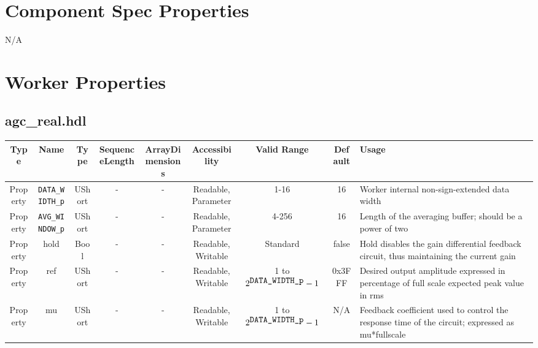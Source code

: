 \documentclass{article}
\def\comp{agc\_real}
\begin{document}
\begin{landscape}
\section*{Component Spec Properties}
	N/A

\section*{Worker Properties}
\subsection*{\comp.hdl}
\begin{scriptsize}
	\begin{tabular}{|c|c|c|c|c|c|c|c|p{6.9cm}|}
		\hline
		\rowcolor{blue}
		Type     & Name                & Type   & SequenceLength & ArrayDimensions & Accessibility       & Valid Range & Default & Usage                                        \\
		\hline
		Property & \verb+DATA_WIDTH_p+ & UShort & -              & -               & Readable, Parameter & 1-16        & 16      & Worker internal non-sign-extended data width \\
		\hline
		Property & \verb+AVG_WINDOW_p+ & UShort & -              & -               & Readable, Parameter & 4-256       & 16      & Length of the averaging buffer; should be a power of two \\
		\hline
		Property & hold                & Bool   & -              & -               & Readable, Writable  & Standard    & false   & Hold disables the gain differential feedback circuit, thus maintaining the current gain \\
		\hline
		Property & ref                 & UShort & -              & -               & Readable, Writable  & 1 to $2^{\verb+DATA_WIDTH_p+}-1$ & 0x3FFF & Desired output amplitude expressed in percentage of full scale expected peak value in rms \\
		\hline
		Property & mu                  & UShort & -              & -               & Readable, Writable  & 1 to $2^{\verb+DATA_WIDTH_p+}-1$ & N/A & Feedback coefficient used to control the response time of the circuit; expressed as mu*fullscale \\
		\hline
	\end{tabular}
\end{scriptsize}


\end{landscape}
\end{document}

